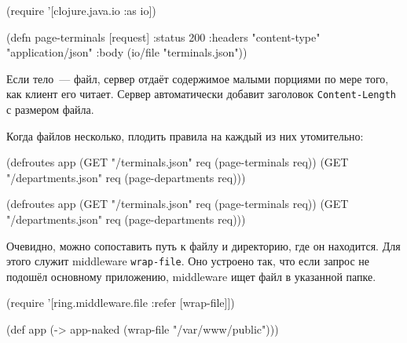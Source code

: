 \else

\begin{english}
  \begin{clojure}
(require '[clojure.java.io :as io])

(defn page-terminals
  [request]
  {:status 200
   :headers {"content-type" "application/json"}
   :body (io/file "terminals.json")})
  \end{clojure}
\end{english}

\fi


Если тело~--- файл, сервер отдаёт содержимое малыми порциями по мере того, как
клиент его читает. Сервер автоматически добавит заголовок
\verb|Content-Length| с размером файла.

Когда файлов несколько, плодить правила на каждый из них утомительно:

\ifnarrow

\begin{english}
  \begin{clojure}
(defroutes app
  (GET "/terminals.json"
       req (page-terminals req))
  (GET "/departments.json"
       req (page-departments req)))
  \end{clojure}
\end{english}

\else

\begin{english}
  \begin{clojure}
(defroutes app
  (GET "/terminals.json"   req (page-terminals req))
  (GET "/departments.json" req (page-departments req)))
  \end{clojure}
\end{english}

\fi


Очевидно, можно сопоставить путь к файлу и директорию, где он находится. Для
этого служит middleware \verb|wrap-file|. Оно устроено так, что если запрос не
подошёл основному приложению, middleware ищет файл в указанной папке.

\ifnarrow

\begin{english}
  \begin{clojure}
(require '[ring.middleware.file
           :refer [wrap-file]])

(def app
  (-> app-naked
      (wrap-file "/var/www/public")))
  \end{clojure}
\end{english}


